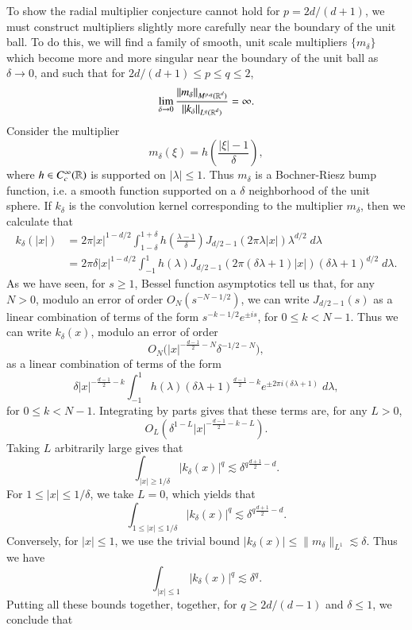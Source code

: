 To show the radial multiplier conjecture cannot hold for $p = 2d/(d+1)$, we must construct multipliers slightly more carefully near the boundary of the unit ball. To do this, we will find a family of smooth, unit scale multipliers $\{ m_\delta \}$ which become more and more singular near the boundary of the unit ball as $\delta \to 0$, and such that for $2d/(d+1) \leq p \leq q \leq 2$,
%
\[ \lim_{\delta \to 0} \frac{\| m_\delta \|_{M^{p,q}(\operatorname{\mathbb{R}}^d)}}{\| k_\delta \|_{L^q(\operatorname{\mathbb{R}}^d)}} = \infty. \]
%
Consider the multiplier 
%
\[ m_\delta(\xi) = h \left( \frac{|\xi| - 1}{\delta} \right), \]
%
where $h \in C_c^\infty(\operatorname{\mathbb{R}})$ is supported on $|\lambda| \leq 1$. Thus $m_\delta$ is a Bochner-Riesz bump function, i.e. a smooth function supported on a $\delta$ neighborhood of the unit sphere. If $k_\delta$ is the convolution kernel corresponding to the multiplier $m_\delta$, then we calculate that
%
\begin{align*}
    k_\delta(|x|) &= 2 \pi |x|^{1 - d/2} \int_{1 - \delta}^{1 + \delta} h \left( \frac{\lambda - 1}{\delta} \right) J_{d/2 - 1}(2 \pi \lambda |x|) \lambda^{d/2}\; d\lambda\\
    &= 2 \pi \delta |x|^{1 - d/2} \int_{-1}^1 h(\lambda) J_{d/2 - 1}(2 \pi (\delta \lambda + 1) |x|) (\delta \lambda + 1)^{d/2}\; d\lambda.
\end{align*}
%
As we have seen, for $s \geq 1$, Bessel function asymptotics tell us that, for any $N > 0$, modulo an error of order $O_N(s^{-N-1/2})$, we can write $J_{d/2-1}(s)$ as a linear combination of terms of the form $s^{-k-1/2} e^{\pm is}$, for $0 \leq k < N-1$. Thus we can write $k_\delta(x)$, modulo an error of order
%
\[ O_N \Bigg( |x|^{- \frac{d-1}{2} - N} \delta^{-1/2-N} \Bigg), \]
%
as a linear combination of terms of the form
%
\[ \delta |x|^{- \frac{d-1}{2} - k} \int_{-1}^1 h(\lambda) (\delta \lambda + 1)^{ \frac{d-1}{2} -k} e^{\pm 2 \pi i (\delta \lambda + 1)}\; d\lambda, \]
%
for $0 \leq k < N-1$. Integrating by parts gives that these terms are, for any $L > 0$,
%
\[ O_L( \delta^{1-L} |x|^{-\frac{d-1}{2} - k - L} ). \]
%
Taking $L$ arbitrarily large gives that
%
\[ \int_{|x| \geq 1/\delta} |k_\delta(x)|^q \lesssim \delta^{q \frac{d+1}{2} - d}. \]
%
For $1 \leq |x| \leq 1/\delta$, we take $L = 0$, which yields that
%
\[ \int_{1 \leq |x| \leq 1/\delta} |k_\delta(x)|^q \lesssim \delta^{q \frac{d+1}{2} - d }. \]
%
Conversely, for $|x| \leq 1$, we use the trivial bound $|k_\delta(x)| \leq \| m_\delta \|_{L^1} \lesssim \delta$. Thus we have
%
\[ \int_{|x| \leq 1} |k_\delta(x)|^q \lesssim \delta^q. \]
%
Putting all these bounds together, together, for $q \geq 2d/(d-1)$ and $\delta \leq 1$, we conclude that
